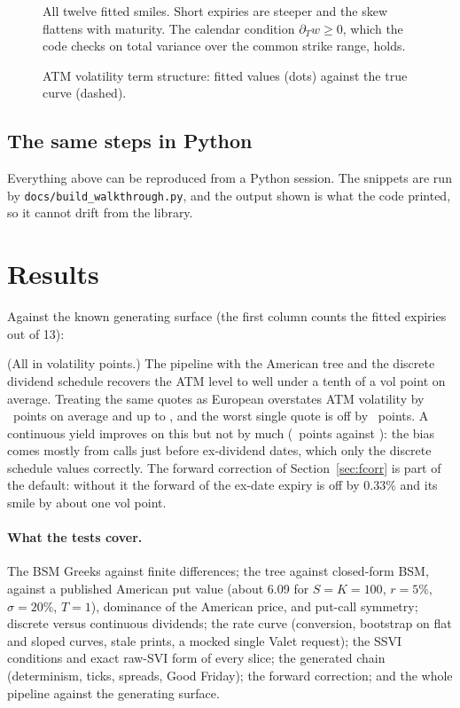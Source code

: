 \documentclass[11pt]{article}
\begin{document}
\begin{figure}[ht]
\centering

\caption{All twelve fitted smiles. Short expiries are steeper and the skew
flattens with maturity. The calendar condition $\partial_Tw\ge0$, which the code
checks on total variance over the common strike range, holds.}
\end{figure}

\begin{figure}[ht]
\centering

\caption{ATM volatility term structure: fitted values (dots) against the true
curve (dashed).}
\end{figure}

\subsection{The same steps in Python}\label{sec:python}

Everything above can be reproduced from a Python session. The snippets are run by
\texttt{docs/\allowbreak build\_\allowbreak walkthrough.py}, and the output shown is what the code printed,
so it cannot drift from the library.



\section{Results}\label{sec:results}

Against the known generating surface (the first column counts the fitted expiries out of 13):



(All in volatility points.) The pipeline with the American tree and the discrete
dividend schedule recovers the ATM level to well under a tenth of a vol point on
average. Treating the same quotes as European overstates ATM volatility by
\atmErrEuropean\ points on average and up to \atmWorstEuropean, and the worst single
quote is off by \quoteWorstEuropean\ points. A continuous yield improves on
this but not by much (\atmErrContinuous\ points against
\atmErrEuropean): the bias comes mostly from calls just before ex-dividend dates,
which only the discrete schedule values correctly. The forward correction of
Section~\ref{sec:fcorr} is part of the default: without it the forward of the
ex-date expiry is off by 0.33\% and its smile by about one vol point.

\paragraph{What the tests cover.} The BSM Greeks against finite differences; the
tree against closed-form BSM, against a published American put value (about 6.09
for $S=K=100$, $r=5\%$, $\sigma=20\%$, $T=1$), dominance of the American price,
and put-call symmetry; discrete versus continuous dividends; the rate curve
(conversion, bootstrap on flat and sloped curves, stale prints, a mocked single
Valet request); the SSVI conditions and exact raw-SVI form of every slice; the
generated chain (determinism, ticks, spreads, Good Friday); the forward
correction; and the whole pipeline against the generating surface.
\end{document}
